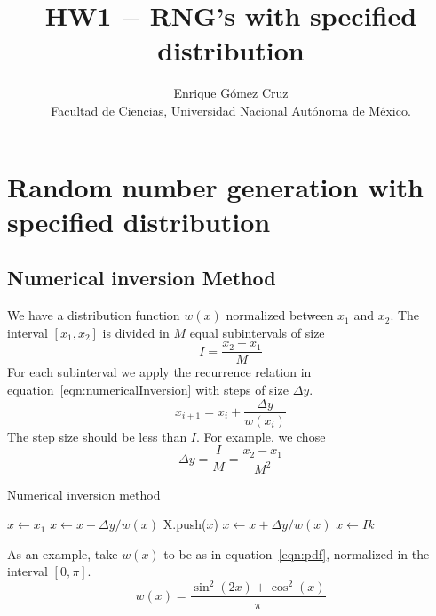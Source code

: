 \documentclass[11pt]{article}
\title{HW1 $-$ RNG's with specified distribution}
\author{Enrique Gómez Cruz\\Facultad de Ciencias, Universidad Nacional Autónoma de México.}
\date{}
\begin{document}
\maketitle

\section{Random number generation with specified distribution}
\subsection{Numerical inversion Method}

We have a distribution function $w(x)$ normalized between $x_1$ and $x_2$. The interval $[x_1,x_2]$ is divided in $M$ equal subintervals of size
\begin{equation*}
  I = \frac{x_2-x_1}{M}
\end{equation*}
For each subinterval we apply the recurrence relation in equation~\ref{eqn:numericalInversion} with steps of size $\Delta y$.
\begin{equation}
  x_{i+1} = x_i + \frac{\Delta y}{w(x_i)}
  \label{eqn:numericalInversion}
\end{equation}
The step size should be less than $I$. For example, we chose
\begin{equation*}
  \Delta y = \frac{I}{M} = \frac{x_2-x_1}{M^2}
\end{equation*}

\begin{algorithm}
 \caption{Numerical inversion method} 
 \label{inversionAlgorithm}
 \begin{algorithmic}[1]
 \State $x\leftarrow x_1$ 
  
 \State $x \leftarrow x + \Delta y/w(x)$
  
 \State X.push($x$)
 \State $x \leftarrow x + \Delta y/w(x)$
 \EndWhile
 \State $x \leftarrow I k$ 
 \EndFor
 \end{algorithmic}
\end{algorithm}

As an example, take $w(x)$ to be as in equation~\ref{eqn:pdf}, normalized in the interval $[0,\pi]$.
\begin{equation}
  w(x)=\frac{\sin^2(2x) + \cos^2(x)}{\pi}
  \label{eqn:pdf}
\end{equation}
\end{document}
